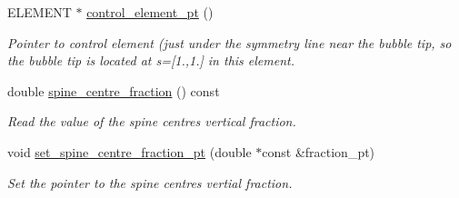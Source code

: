 \begin{DoxyCompactItemize}
E\+L\+E\+M\+E\+NT $\ast$ \hyperlink{classoomph_1_1BrethertonSpineMesh_a9b02893724c76098f75d9285e9985f4b}{control\+\_\+element\+\_\+pt} ()
\begin{DoxyCompactList}\small\item\em Pointer to control element (just under the symmetry line near the bubble tip, so the bubble tip is located at s=\mbox{[}1.,1.\mbox{]} in this element. \end{DoxyCompactList}\item 
double \hyperlink{classoomph_1_1BrethertonSpineMesh_a67f784e7b3a898af6c60515042c3ea73}{spine\+\_\+centre\+\_\+fraction} () const
\begin{DoxyCompactList}\small\item\em Read the value of the spine centre\textquotesingle{}s vertical fraction. \end{DoxyCompactList}\item 
void \hyperlink{classoomph_1_1BrethertonSpineMesh_a33c3ed5af92e7b22a22615f42c34c387}{set\+\_\+spine\+\_\+centre\+\_\+fraction\+\_\+pt} (double $\ast$const \&fraction\+\_\+pt)
\begin{DoxyCompactList}\small\item\em Set the pointer to the spine centre\textquotesingle{}s vertial fraction. \end{DoxyCompactList}\end{DoxyCompactItemize}
